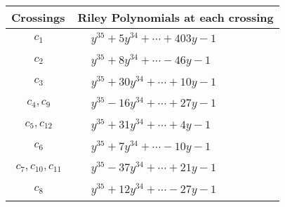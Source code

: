 \documentclass[1p]{elsarticle_modified}
\theoremstyle{definition}
\begin{document}
\begin{tabular}{m{50pt}|m{274pt}}
Crossings & \hspace{64pt}Riley Polynomials at each crossing \\
\hline $$\begin{aligned}c_{1}\end{aligned}$$&$\begin{aligned}
&y^{35}+5 y^{34}+\cdots+403 y-1
\end{aligned}$\\
\hline $$\begin{aligned}c_{2}\end{aligned}$$&$\begin{aligned}
&y^{35}+8 y^{34}+\cdots-46 y-1
\end{aligned}$\\
\hline $$\begin{aligned}c_{3}\end{aligned}$$&$\begin{aligned}
&y^{35}+30 y^{34}+\cdots+10 y-1
\end{aligned}$\\
\hline $$\begin{aligned}c_{4},c_{9}\end{aligned}$$&$\begin{aligned}
&y^{35}-16 y^{34}+\cdots+27 y-1
\end{aligned}$\\
\hline $$\begin{aligned}c_{5},c_{12}\end{aligned}$$&$\begin{aligned}
&y^{35}+31 y^{34}+\cdots+4 y-1
\end{aligned}$\\
\hline $$\begin{aligned}c_{6}\end{aligned}$$&$\begin{aligned}
&y^{35}+7 y^{34}+\cdots-10 y-1
\end{aligned}$\\
\hline $$\begin{aligned}c_{7},c_{10},c_{11}\end{aligned}$$&$\begin{aligned}
&y^{35}-37 y^{34}+\cdots+21 y-1
\end{aligned}$\\
\hline $$\begin{aligned}c_{8}\end{aligned}$$&$\begin{aligned}
&y^{35}+12 y^{34}+\cdots-27 y-1
\end{aligned}$\\
\hline
\end{tabular}\\~\\
\end{document}
